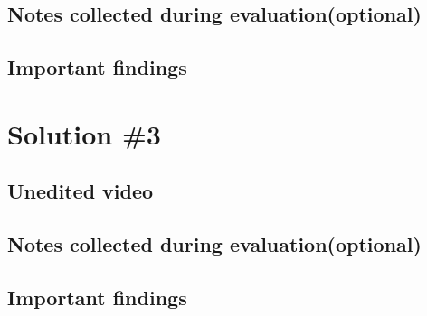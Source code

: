 \documentclass[a4paper,10pt,oneside]{scrreprt}
\begin{document}
\subsection{Notes collected during evaluation(optional)}

\subsection{Important findings}

\section{Solution \#3}
\subsection{Unedited video}

\subsection{Notes collected during evaluation(optional)}

\subsection{Important findings}
\end{document}
